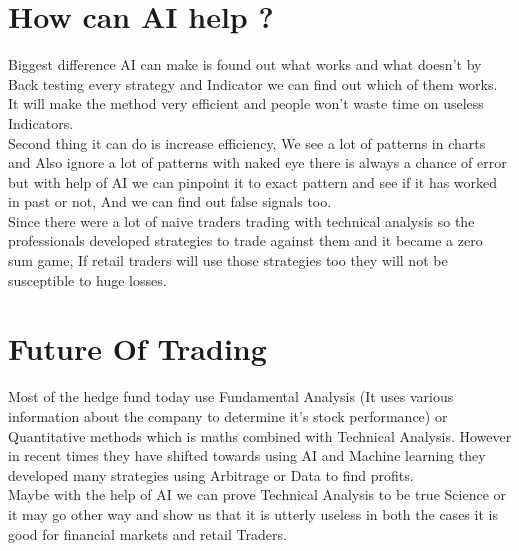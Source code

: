 \documentclass{article}
\begin{document}
 \section{How can AI help ?}
Biggest difference AI can make is found out what works and what doesn't by Back testing every strategy and Indicator we can find out which of them works. It will make the method very efficient and people won't waste time on useless Indicators. \\
Second thing it can do is increase efficiency, We see a lot of patterns in charts and Also ignore a lot of patterns with naked eye there is always a chance of error but with help of AI we can pinpoint it to exact pattern and see if it has worked in past or not, And we can find out false signals too.
\\
Since there were a lot of naive traders trading with technical analysis so the professionals developed strategies to trade against them and it became a zero sum game, If retail traders will use those strategies too they will not be susceptible to huge losses.

\section{Future Of Trading }
Most of the hedge fund today use Fundamental Analysis (It uses various information about the company to determine it's stock performance) or Quantitative methods which is maths combined with Technical Analysis. However in recent times they have shifted towards using AI and Machine learning they developed many strategies using Arbitrage or Data to find profits. 
\\
Maybe with the help of AI we can prove Technical Analysis to be true Science or it may go other way and show us that it is utterly useless in both the cases it is good for financial markets and retail Traders.
\end{document}
